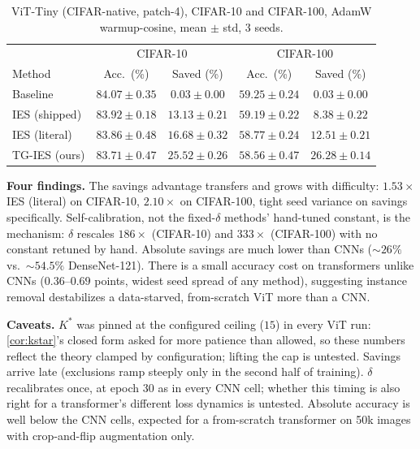\documentclass{article}
\newcommand{\win}[1]{\cellcolor{tgwin}#1}
\newcommand{\lose}[1]{\cellcolor{tglose}#1}
\theoremstyle{plain}
\theoremstyle{definition}
\theoremstyle{remark}
\begin{document}
\begin{table}[h]
\caption{ViT-Tiny (CIFAR-native, patch-4), CIFAR-10 and CIFAR-100, AdamW warmup-cosine, mean $\pm$ std, 3 seeds.}
\label{tab:vit10}
\label{tab:vit100}
\centering
\small
\begin{tabular}{lcccc}
\toprule
& \multicolumn{2}{c}{CIFAR-10} & \multicolumn{2}{c}{CIFAR-100} \\
Method & Acc.\ (\%) & Saved (\%) & Acc.\ (\%) & Saved (\%) \\
\midrule
Baseline & $84.07\pm0.35$ & $0.03\pm0.00$ & $59.25\pm0.24$ & $0.03\pm0.00$ \\
IES (shipped) & $83.92\pm0.18$ & $13.13\pm0.21$ & $59.19\pm0.22$ & $8.38\pm0.22$ \\
IES (literal) & $83.86\pm0.48$ & $16.68\pm0.32$ & $58.77\pm0.24$ & $12.51\pm0.21$ \\
\win{TG-IES (ours)} & \lose{$83.71\pm0.47$} & \win{$\mathbf{25.52\pm0.26}$} & \lose{$58.56\pm0.47$} & \win{$\mathbf{26.28\pm0.14}$} \\
\bottomrule
\end{tabular}
\end{table}

\textbf{Four findings.} The savings advantage transfers and grows with difficulty: $1.53\times$ IES (literal) on CIFAR-10, $2.10\times$ on CIFAR-100, tight seed variance on savings specifically. Self-calibration, not the fixed-$\delta$ methods' hand-tuned constant, is the mechanism: $\delta$ rescales $186\times$ (CIFAR-10) and $333\times$ (CIFAR-100) with no constant retuned by hand. Absolute savings are much lower than CNNs ($\sim\!26\%$ vs.\ $\sim\!54.5\%$ DenseNet-121). There is a small accuracy cost on transformers unlike CNNs ($0.36$--$0.69$ points, widest seed spread of any method), suggesting instance removal destabilizes a data-starved, from-scratch ViT more than a CNN.

\textbf{Caveats.} $K^*$ was pinned at the configured ceiling ($15$) in every ViT run: \cref{cor:kstar}'s closed form asked for more patience than allowed, so these numbers reflect the theory clamped by configuration; lifting the cap is untested. Savings arrive late (exclusions ramp steeply only in the second half of training). $\delta$ recalibrates once, at epoch 30 as in every CNN cell; whether this timing is also right for a transformer's different loss dynamics is untested. Absolute accuracy is well below the CNN cells, expected for a from-scratch transformer on 50k images with crop-and-flip augmentation only.
\end{document}
